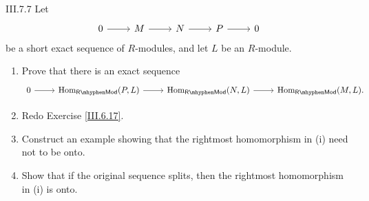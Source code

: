 \begin{problem}{III.7.7}
Let
\[
\begin{tikzcd}
0 \arrow[r] &M \arrow[r] &N \arrow[r] &P \arrow[r] &0
\end{tikzcd}
\]
be a short exact sequence of $R$-modules, and let $L$ be an $R$-module.
\begin{enumerate}[label=(\roman*)]
    \setlength\itemsep{0pt}
    \item Prove that there is an exact sequence 
    \[
    \begin{tikzcd}
    0 \arrow[r] &\Hom_\mathsf{R\mhyphen Mod}(P,L) \arrow[r] &\Hom_\mathsf{R\mhyphen Mod}(N,L) \arrow[r] &\Hom_\mathsf{R\mhyphen Mod}(M,L).
    \end{tikzcd}
    \]
    \item Redo Exercise \ref{III.6.17}.
    \item Construct an example showing that the rightmost homomorphism in (i) need not to be onto.
    \item Show that if the original sequence splits, then the rightmost homomorphism in (i) is onto.
\end{enumerate}
\end{problem}
